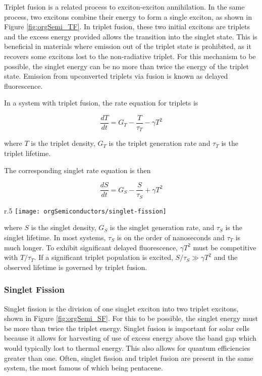 \documentclass[../thesis.tex]{subfiles}
\begin{document}
Triplet fusion is a related process to exciton-exciton annihilation.
In the same process, two excitons combine their energy to form a single exciton, as shown in Figure \ref{fig:orgSemi_TF}.
In triplet fusion, these two initial excitons are triplets and the excess energy provided allows the transition into the singlet state.  
This is beneficial in materials where emission out of the triplet state is prohibited, as it recovers some excitons lost to the non-radiative triplet.
For this mechanism to be possible, the singlet energy can be no more than twice the energy of the triplet state.
Emission from upconverted triplets via fusion is known as delayed fluorescence.

In a system with triplet fusion, the rate equation for triplets is\supercite{Ryasnyanskiy2011}

\begin{equation}
\frac{dT}{dt}=G_T-\frac{T}{\tau_T}-\gamma T^2
    \label{eqn:triplet_fusion}
\end{equation}

where $T$ is the triplet density, $G_T$ is the triplet generation rate and $\tau_T$ is the triplet lifetime.

The corresponding singlet rate equation is then 

\begin{equation}
\frac{dS}{dt}=G_S-\frac{S}{\tau_S}+\gamma T^2
    \label{eqn:triplet_fusion_singlet}
\end{equation}

\begin{wrapfigure}{r}{.5\textwidth}
\centering
\texttt{[image: orgSemiconductors/singlet-fission]}
\caption{Singlet fission into two triplet excitons.}
\label{fig:orgSemi_SF}
\end{wrapfigure}

where $S$ is the singlet density, $G_S$ is the singlet generation rate, and $\tau_S$ is the singlet lifetime.
In most systems, $\tau_S$ is on the order of nanoseconds and $\tau_T$ is much longer.  
To exhibit significant delayed fluorescence, $\gamma T^2$ must be competitive with $T/\tau_T$.
If a significant triplet population is excited, $S/\tau_S\gg \gamma T^2$ and the observed lifetime is governed by triplet fusion.  

\subsubsection{Singlet Fission}

Singlet fission is the division of one singlet exciton into two triplet excitons, shown in Figure \ref{fig:orgSemi_SF}.\supercite{Congreve2013,Smith2010,Lee2013a}
For this to be possible, the singlet energy must be more than twice the triplet energy.  
Singlet fusion is important for solar cells because it allows for harvesting of use of excess energy above the band gap which would typically lost to thermal energy.  
This also allows for quantum efficiencies greater than one.
Often, singlet fission and triplet fusion are present in the same system, the most famous of which being pentacene.\supercite{Ryasnyanskiy2011}
\end{document}
